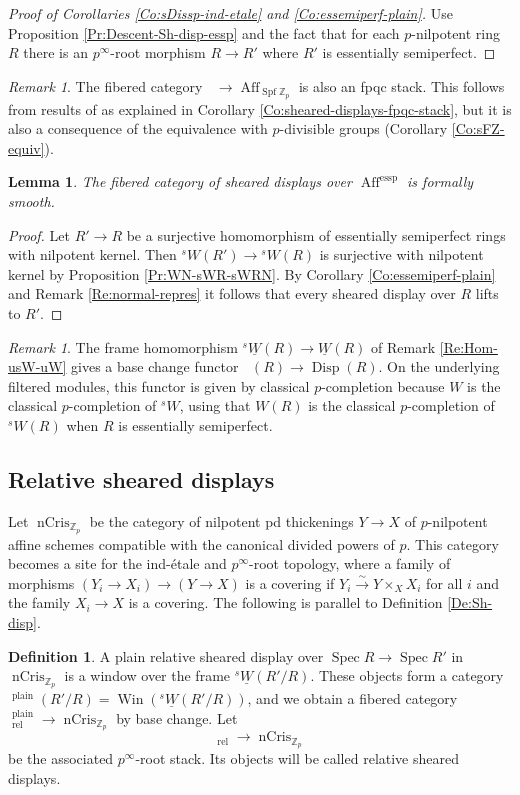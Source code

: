 \documentclass[a4paper,11pt]{amsart}
\theoremstyle{plain}
\newtheorem{Lemma}[equation]{Lemma}
\theoremstyle{definition}
\newtheorem{Defn}[equation]{Definition}
\theoremstyle{remark}
\newtheorem{Remark}[equation]{Remark}
\newcommand{\bLe}{\begin{Lemma}}
\newcommand{\eLe}{\end{Lemma}}
\newcommand{\bDe}{\begin{Defn}}
\newcommand{\eDe}{\end{Defn}}
\newcommand{\bRe}{\begin{Remark}}
\newcommand{\eRe}{\end{Remark}}
\newcommand{\bproof}{\begin{proof}}
\newcommand{\eproof}{\end{proof}}
\renewcommand{\u}{\underline}
\numberwithin{equation}{section}
\newcommand{\ZZ}{{\mathbb{Z}}}
\DeclareMathOperator{\essemiperf}{essp}
\DeclareMathOperator{\plain}{plain}
\DeclareMathOperator{\rel}{rel}
\DeclareMathOperator{\Aff}{Aff}
\DeclareMathOperator{\nCrys}{nCris}
\DeclareMathOperator{\Disp}{Disp}
\DeclareMathOperator{\sDisp}{{}^sDisp}
\DeclareMathOperator{\Spf}{Spf}
\DeclareMathOperator{\Spec}{Spec}
\DeclareMathOperator{\Win}{Win}
\newcommand{\sW}{{}^sW}
\newcommand{\usW}{{}^s\u W}
\begin{document}
\bproof[Proof of Corollaries \ref{Co:sDissp-ind-etale} and \ref{Co:essemiperf-plain}]
Use Proposition \ref{Pr:Descent-Sh-disp-essp} and the fact that for each $p$-nilpotent ring $R$ there is an $p^\infty$-root morphism $R\to R'$ where $R'$ is essentially semiperfect.
\eproof

\bRe
\label{Re:sDisp-fpqc-stack}
The fibered category $\sDisp\to\Aff_{\Spf\ZZ_p}$ is also an fpqc stack.
This follows from results of \cite{BMVZ} as explained in Corollary \ref{Co:sheared-displays-fpqc-stack}, but it is also a consequence of the equivalence with $p$-divisible groups (Corollary \ref{Co:sFZ-equiv}).
\eRe

\bLe
\label{Le:sDisp-form-smooth-essp}
The fibered category of sheared displays over $\Aff^{\essemiperf}$ is formally smooth.
\eLe

\bproof
Let $R'\to R$ be a surjective homomorphism of essentially semiperfect rings with nilpotent kernel. Then $\sW(R')\to\sW(R)$ is surjective with nilpotent kernel by Proposition \ref{Pr:WN-sWR-sWRN}. By Corollary \ref{Co:essemiperf-plain} and Remark \ref{Re:normal-repres} it follows that every sheared display over $R$ lifts to $R'$.
\eproof

\bRe
\label{Re:sDisp-Disp}
The frame homomorphism $\usW(R)\to\u W(R)$ of Remark \ref{Re:Hom-usW-uW} gives a base change functor $\sDisp(R)\to\Disp(R)$. On the underlying filtered modules, this functor is given by classical $p$-completion because $W$ is the classical $p$-completion of $\sW$, using that $W(R)$ is the classical $p$-completion of $\sW(R)$ when $R$ is essentially semiperfect. 
\eRe

\subsection{Relative sheared displays}
\label{Se:rel-sh-disp}

Let $\nCrys_{\ZZ_p}$ be the category of nilpotent pd thickenings $Y\to X$ of $p$-nilpotent affine schemes compatible with the canonical divided powers of $p$. This category becomes a site for the ind-\'etale and $p^\infty$-root topology, where a family of morphisms $(Y_i\to X_i)\to(Y\to X)$ is a covering if $Y_i\xrightarrow\sim Y\times_XX_i$ for all $i$ and the family $X_i\to X$ is a covering.
The following is parallel to Definition \ref{De:Sh-disp}.

\bDe
\label{De:Sh-disp-rel}
A plain relative sheared display over $\Spec R\to\Spec R'$ in $\nCrys_{\ZZ_p}$ is a window over the frame $\usW(R'/R)$. 
These objects form a category $\sDisp^{\plain}(R'/R)=\Win(\usW(R'/R))$, and we obtain a fibered category $\sDisp_{\rel}^{\plain}\to\nCrys_{\ZZ_p}$ by base change. 
Let 
\[
\sDisp_{\rel}\to\nCrys_{\ZZ_p}
\]
be the associated $p^\infty$-root stack. Its objects will be called relative sheared displays.
\eDe
\end{document}
